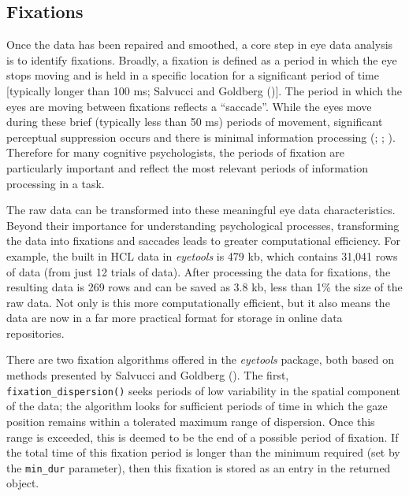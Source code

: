 \documentclass[
  man,
  floatsintext,
  longtable,
  nolmodern,
  notxfonts,
  notimes,
  colorlinks=true,linkcolor=blue,citecolor=blue,urlcolor=blue]{apa7}
\begin{document}
\subsection{Fixations}\label{fixations}

Once the data has been repaired and smoothed, a core step in eye data
analysis is to identify fixations. Broadly, a fixation is defined as a
period in which the eye stops moving and is held in a specific location
for a significant period of time {[}typically longer than 100 ms;
Salvucci and Goldberg (){]}. The period
in which the eyes are moving between fixations reflects a ``saccade''.
While the eyes move during these brief (typically less than 50 ms)
periods of movement, significant perceptual suppression occurs and there
is minimal information processing (; ;
). Therefore for
many cognitive psychologists, the periods of fixation are particularly
important and reflect the most relevant periods of information
processing in a task.

The raw data can be transformed into these meaningful eye data
characteristics. Beyond their importance for understanding psychological
processes, transforming the data into fixations and saccades leads to
greater computational efficiency. For example, the built in HCL data in
\emph{eyetools} is 479 kb, which contains 31,041 rows of data (from just
12 trials of data). After processing the data for fixations, the
resulting data is 269 rows and can be saved as 3.8 kb, less than 1\% the
size of the raw data. Not only is this more computationally efficient,
but it also means the data are now in a far more practical format for
storage in online data repositories.

There are two fixation algorithms offered in the \emph{eyetools}
package, both based on methods presented by Salvucci and Goldberg
(). The first,
\texttt{fixation\_dispersion()} seeks periods of low variability in the
spatial component of the data; the algorithm looks for sufficient
periods of time in which the gaze position remains within a tolerated
maximum range of dispersion. Once this range is exceeded, this is deemed
to be the end of a possible period of fixation. If the total time of
this fixation period is longer than the minimum required (set by the
\texttt{min\_dur} parameter), then this fixation is stored as an entry
in the returned object.
\end{document}

